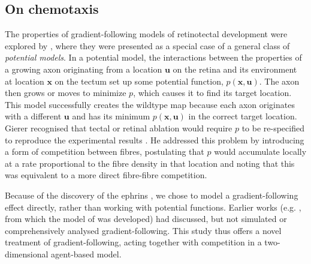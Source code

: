 \documentclass[11pt, a4paper]{article}
\begin{document}


\subsection*{On chemotaxis}

The properties of gradient-following models of retinotectal development were explored by \citet{gierer_development_1981,gierer_model_1983,gierer_directional_1987}, where they were presented as a special case of a general class of \emph{potential models}. 
In a potential model, the interactions between the properties of a growing axon originating from a location $\mathbf{u}$ on the retina and its environment at location $\mathbf{x}$ on the tectum set up some potential function, $p(\mathbf{x},\mathbf{u})$. 
The axon then grows or moves to minimize $p$, which causes it to find its target location. This model successfully creates the wildtype map because each axon originates with a different $\mathbf{u}$ and has its minimum $p(\mathbf{x},\mathbf{u})$ in the correct target location. 
Gierer recognised that tectal or retinal ablation would require $p$ to be re-specified to reproduce the experimental results \citep{attardi_preferential_1963,schmidt_retinal_1978,schmidt_expansion_1978}.
He addressed this problem by introducing a form of competition between fibres, postulating that $p$ would accumulate locally at a rate proportional to the fibre density in that location and noting that this was equivalent to a more direct fibre-fibre competition.

Because of the discovery of the ephrins \citep{cheng_complementary_1995,drescher_vitro_1995}, we chose to model a gradient-following effect directly, rather than working with potential functions.
Earlier works (e.g. \citet{hope_arrow_1976}, from which the model of \citet{simpson_simple_2011} was developed) had discussed, but not simulated or comprehensively analysed gradient-following.
This study thus offers a novel treatment of gradient-following, acting together with competition in a two-dimensional agent-based model.
\end{document}
